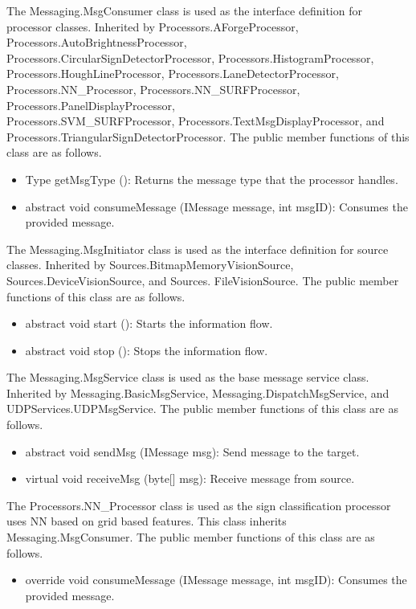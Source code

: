 \documentclass[a4paper,oneside,12pt]{report}
\begin{document}
The Messaging.MsgConsumer class is used as the interface definition for processor classes.
Inherited by Processors.AForgeProcessor, Processors.AutoBrightnessProcessor, \\
Processors.CircularSignDetectorProcessor, Processors.HistogramProcessor, \\
Processors.HoughLineProcessor, Processors.LaneDetectorProcessor, \\
Processors.NN\_Processor, Processors.NN\_SURFProcessor, Processors.PanelDisplayProcessor, \\
Processors.SVM\_SURFProcessor, Processors.TextMsgDisplayProcessor, and \\
Processors.TriangularSignDetectorProcessor.
The public member functions of this class are as follows.
\begin{itemize}
\item Type getMsgType (): Returns the message type that the processor handles. 
\item abstract void consumeMessage (IMessage message, int msgID): Consumes the provided message. 
\end{itemize}

The Messaging.MsgInitiator class is used as the interface definition for source classes.
Inherited by Sources.BitmapMemoryVisionSource, Sources.DeviceVisionSource,
and Sources. FileVisionSource. The public member functions of this class are as follows.
\begin{itemize}
\item abstract void start (): Starts the information flow. 
\item abstract void stop (): Stops the information flow. 
\end{itemize}

The Messaging.MsgService class is used as the base message service class.
Inherited by Messaging.BasicMsgService, Messaging.DispatchMsgService, and \\
UDPServices.UDPMsgService. The public member functions of this class are as follows.
\begin{itemize}
\item abstract void sendMsg (IMessage msg): Send message to the target. 
\item virtual void receiveMsg (byte[] msg): Receive message from source. 
\end{itemize}

The Processors.NN\_Processor class is used as the sign classification processor uses NN based on grid based features.
This class inherits Messaging.MsgConsumer.
The public member functions of this class are as follows.
\begin{itemize}
\item override void consumeMessage (IMessage message, int msgID): Consumes the provided message. 
\end{itemize}
\end{document}
